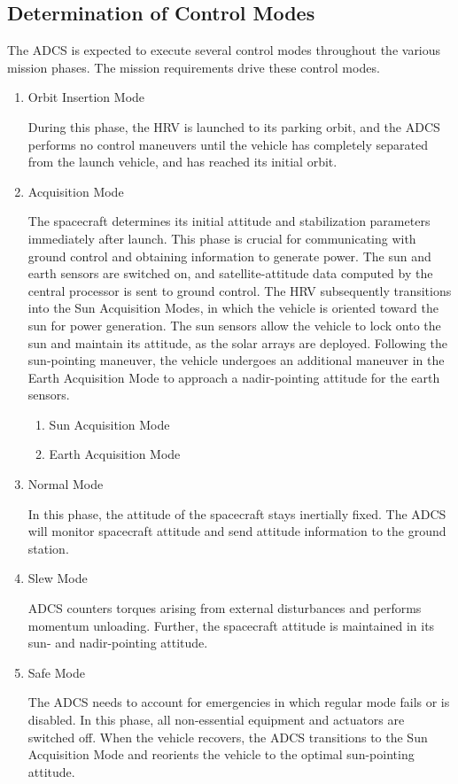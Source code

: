 \documentclass[paper=letter, fontsize=11pt]{scrartcl} %
\numberwithin{equation}{section} %
\numberwithin{figure}{section} %
\numberwithin{table}{section} %
\begin{document}
\subsection{Determination of Control Modes}
The ADCS is expected to execute several control modes throughout the various mission phases. The mission requirements drive these control modes.
\begin{enumerate}
    \item Orbit Insertion Mode
          \par During this phase, the HRV is launched to its parking orbit, and the ADCS performs no control maneuvers until the vehicle has completely separated from the launch vehicle, and has reached its initial orbit.
    \item Acquisition Mode
          \par The spacecraft determines its initial attitude and stabilization parameters immediately after launch. This phase is crucial for communicating with ground control and obtaining information to generate power. The sun and earth sensors are switched on, and satellite-attitude data computed by the central processor is sent to ground control. The HRV subsequently transitions into the Sun Acquisition Modes, in which the vehicle is oriented toward the sun for power generation. The sun sensors allow the vehicle to lock onto the sun and maintain its attitude, as the solar arrays are deployed. Following the sun-pointing maneuver, the vehicle undergoes an additional maneuver in the Earth Acquisition Mode to approach a nadir-pointing attitude for the earth sensors.
          \begin{enumerate}
            \item Sun Acquisition Mode
            \item Earth Acquisition Mode
          \end{enumerate}
    \item Normal Mode
          \par In this phase, the attitude of the spacecraft stays inertially fixed. The ADCS will monitor spacecraft attitude and send attitude information to the ground station.
    \item Slew Mode
          \par ADCS counters torques arising from external disturbances and performs momentum unloading. Further, the spacecraft attitude is maintained in its sun- and nadir-pointing attitude.
    \item Safe Mode
          \par The ADCS needs to account for emergencies in which regular mode fails or is disabled. In this phase, all non-essential equipment and actuators are switched off. When the vehicle recovers, the ADCS transitions to the Sun Acquisition Mode and reorients the vehicle to the optimal sun-pointing attitude.
\end{enumerate}
\end{document}

